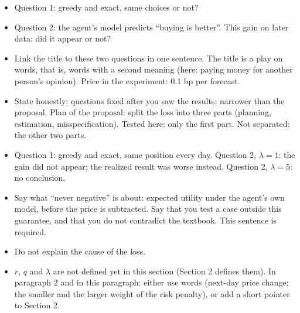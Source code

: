 \documentclass{article}
\newenvironment{pts}{\begin{itemize}[nosep,leftmargin=1.15em,topsep=1pt]}{\end{itemize}}
\begin{document}
\begin{note}
\begin{pts}
\item Question 1: greedy and exact, same choices or not?
\item Question 2: the agent's model predicts ``buying is better''. This gain on later data: did it appear or not?
\item Link the title to these two questions in one sentence. The title is a play on words, that is, words with a second meaning (here: paying money for another person's opinion). Price in the experiment: 0.1 bp per forecast.
\item State honestly: questions fixed after you saw the results; narrower than the proposal. Plan of the proposal: split the loss into three parts (planning, estimation, misspecification). Tested here: only the first part. Not separated: the other two parts.
\end{pts}
\end{note}

\begin{note}
\begin{pts}
\item Question 1: greedy and exact, same position every day. Question 2, $\lambda=1$: the gain did not appear; the realized result was worse instead. Question 2, $\lambda=5$: no conclusion.
\item Say what ``never negative'' is about: expected utility under the agent's own model, before the price is subtracted. Say that you test a case outside this guarantee, and that you do not contradict the textbook. This sentence is required.
\item Do not explain the cause of the loss.
\item $r$, $q$ and $\lambda$ are not defined yet in this section (Section 2 defines them). In paragraph 2 and in this paragraph: either use words (next-day price change; the smaller and the larger weight of the risk penalty), or add a short pointer to Section 2.
\end{pts}
\end{note}
\end{document}
